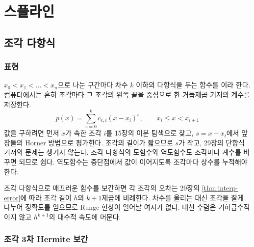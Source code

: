 \chapter{스플라인}
\label{ch:splines}


\section{조각 다항식}
\label{sec:ppoly}

\subsection{표현}

 $x_0<x_1<\dots<x_n$으로 나눈 구간마다 차수 $k$ 이하의 다항식을 두는 함수를 이라 한다. 컴퓨터에서는 흔히 조각마다 그 조각의 왼쪽 끝을 중심으로 한 거듭제곱 기저의 계수를 저장한다.
\[
p(x)=\sum_{e=0}^kc_{e,i}(x-x_i)^e,\qquad x_i\le x<x_{i+1}
\]
값을 구하려면 먼저 $x$가 속한 조각 $i$를 15장의 이분 탐색으로 찾고, $s=x-x_i$에서 앞 장들의 Horner 방법으로 평가한다. 조각의 길이가 짧으므로 $s$가 작고, 29장의 단항식 기저의 문제는 생기지 않는다. 조각 다항식의 도함수와 역도함수도 조각마다 계수를 바꾸면 되므로 쉽다. 역도함수는 중단점에서 값이 이어지도록 조각마다 상수를 누적해야 한다.

조각 다항식으로 매끄러운 함수를 보간하면 각 조각의 오차는 29장의 \cref{thm:interp-error}에 따라 조각 길이 $h$의 $k+1$제곱에 비례한다. 차수를 올리는 대신 조각을 잘게 나누어 정확도를 얻으므로 Runge 현상이 일어날 여지가 없다. 대신 수렴은 기하급수적이지 않고 $h^{k+1}$의 대수적 속도에 머문다.

\subsection{조각 3차 Hermite 보간}


